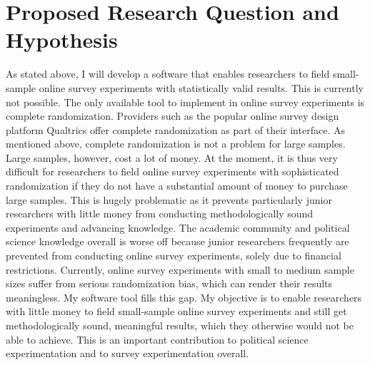 \documentclass[11pt]{article}
\begin{document}
\section*{Proposed Research Question and Hypothesis}

\vspace{0.3cm}

As stated above, I will develop a software that enables researchers to field small-sample online survey experiments with statistically valid results. This is currently not possible. The only available tool to implement in online survey experiments is complete randomization. Providers such as the popular online survey design platform Qualtrics offer complete randomization as part of their interface. As mentioned above, complete randomization is not a problem for large samples. Large samples, however, cost a lot of money. At the moment, it is thus very difficult for researchers to field online survey experiments with sophisticated randomization if they do not have a substantial amount of money to purchase large samples. This is hugely problematic as it prevents particularly junior researchers with little money from conducting methodologically sound experiments and advancing knowledge. The academic community and political science knowledge overall is worse off because junior researchers frequently are prevented from conducting online survey experiments, solely due to financial restrictions. Currently, online survey experiments with small to medium sample sizes suffer from serious randomization bias, which can render their results meaningless. My software tool fills this gap. My objective is to enable researchers with little money to field small-sample online survey experiments and still get methodologically sound, meaningful results, which they otherwise would not be able to achieve. This is an important contribution to political science experimentation and to survey experimentation overall.

\vspace{0.3cm}
\end{document}
